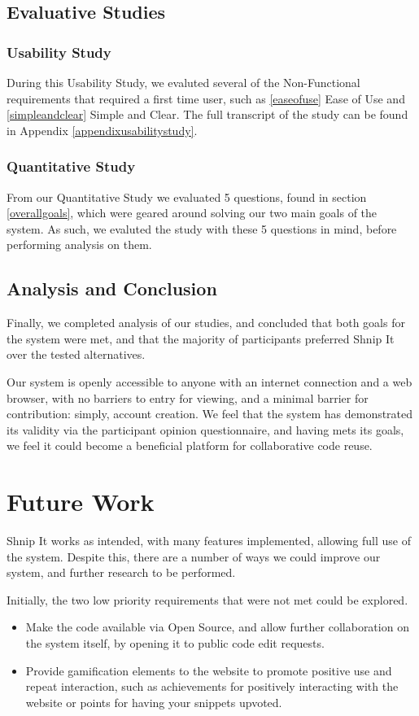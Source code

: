 \subsection{Evaluative Studies}
\subsubsection{Usability Study}
During this Usability Study, we evaluted several of the Non-Functional requirements that required a first time user, such as \ref{easeofuse} Ease of Use and \ref{simpleandclear} Simple and Clear.
The full transcript of the study can be found in Appendix \ref{appendixusabilitystudy}.

\subsubsection{Quantitative Study}
From our Quantitative Study we evaluated 5 questions, found in section \ref{overallgoals}, which were geared around solving our two main goals of the system.
As such, we evaluted the study with these 5 questions in mind, before performing analysis on them.

\subsection{Analysis and Conclusion}
Finally, we completed analysis of our studies, and concluded that both goals for the system were met, and that the majority of participants preferred Shnip It over the tested alternatives.

Our system is openly accessible to anyone with an internet connection and a web browser, with no barriers to entry for viewing, and a minimal barrier for contribution: simply, account creation. 
We feel that the system has demonstrated its validity via the participant opinion questionnaire, and having mets its goals, we feel it could become a beneficial platform for collaborative code reuse.


\section{Future Work} \label{futurework}
Shnip It works as intended, with many features implemented, allowing full use of the system.
Despite this, there are a number of ways we could improve our system, and further research to be performed.

Initially, the two low priority requirements that were not met could be explored.
\begin{itemize}
\item Make the code available via Open Source, and allow further collaboration on the system itself, by opening it to public code edit requests.
\item Provide gamification elements to the website to promote positive use and repeat interaction, such as achievements for positively interacting with the website or points for having your snippets upvoted.
\end{itemize}

